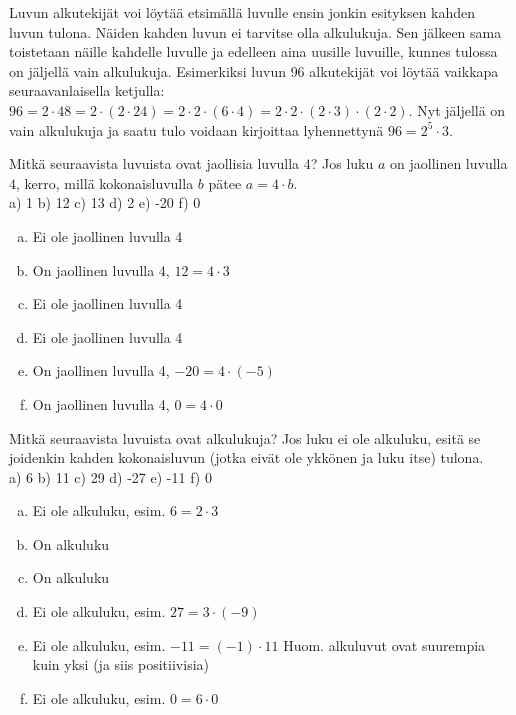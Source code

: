 Luvun alkutekijät voi löytää etsimällä luvulle ensin jonkin esityksen kahden luvun tulona. Näiden kahden luvun ei tarvitse olla alkulukuja. Sen jälkeen sama toistetaan näille kahdelle luvulle ja edelleen aina uusille luvuille, kunnes tulossa on jäljellä vain alkulukuja. Esimerkiksi luvun $96$ alkutekijät voi löytää vaikkapa seuraavanlaisella ketjulla: $96 = 2 \cdot 48 = 2 \cdot (2 \cdot 24) = 2 \cdot 2 \cdot (6 \cdot 4) = 2 \cdot 2 \cdot (2 \cdot 3) \cdot (2 \cdot 2)$. Nyt jäljellä on vain alkulukuja ja saatu tulo voidaan kirjoittaa lyhennettynä $96 = 2^5 \cdot 3$.

\begin{tehtava}
Mitkä seuraavista luvuista ovat jaollisia luvulla $4$? Jos luku $a$ on jaollinen luvulla $4$, kerro, millä kokonaisluvulla $b$ pätee $a = 4 \cdot b$.\\
a) 1 \quad b) 12  \quad c) 13 \quad d) 2 \quad e) -20 \quad f) 0

\begin{vastaus}
\begin{enumerate}[a)]
	\item Ei ole jaollinen luvulla 4
	\item On jaollinen luvulla 4, $12 = 4 \cdot 3$
	\item Ei ole jaollinen luvulla 4
	\item Ei ole jaollinen luvulla 4
	\item On jaollinen luvulla 4, $-20 = 4 \cdot (-5)$
	\item On jaollinen luvulla 4, $0 = 4 \cdot 0$
\end{enumerate}
\end{vastaus}
\end{tehtava}

\begin{tehtava}
Mitkä seuraavista luvuista ovat alkulukuja? Jos luku ei ole alkuluku, esitä se joidenkin kahden kokonaisluvun (jotka eivät ole ykkönen ja luku itse) tulona.\\
a) 6 \quad b) 11 \quad c) 29 \quad d) -27 \quad e) -11 \quad f) 0

\begin{vastaus}
\begin{enumerate}[a)]
	\item Ei ole alkuluku, esim. $6 = 2 \cdot 3$
	\item On alkuluku
	\item On alkuluku
	\item Ei ole alkuluku, esim. $27 = 3 \cdot (-9)$
	\item Ei ole alkuluku, esim. $-11 = (-1) \cdot 11$ Huom. alkuluvut ovat suurempia kuin yksi (ja siis positiivisia)
	\item Ei ole alkuluku, esim. $0 = 6 \cdot 0$
\end{enumerate}
\end{vastaus}
\end{tehtava}

